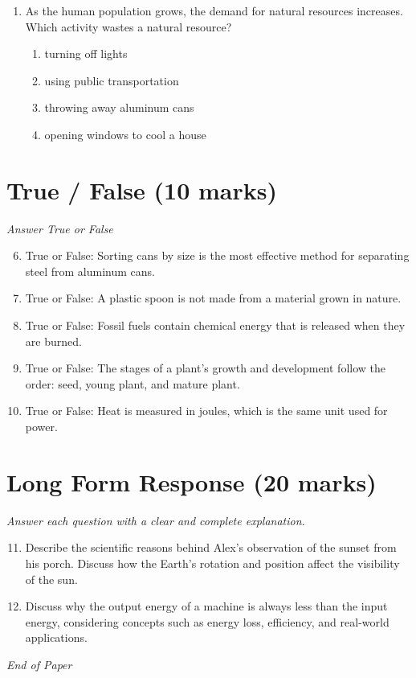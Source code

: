 \documentclass[12pt]{article}
\begin{document}
\begin{enumerate}[label=\arabic*.]
\begin{enumerate}[label=(\alph*)]
    \item The distance is a rough estimate.
    \item Only light can travel between stars.
    \item Light signals were timed reflecting from the star.
\end{enumerate}
\item As the human population grows, the demand for natural resources increases. Which activity wastes a natural resource?
\begin{enumerate}[label=(\alph*)]
    \item turning off lights
    \item using public transportation
    \item throwing away aluminum cans
    \item opening windows to cool a house
\end{enumerate}
\end{enumerate}

\section*{True / False (10 marks)}
\textit{Answer True or False}
\begin{enumerate}[label=\arabic*.]
\setcounter{enumi}{5}
\item True or False: Sorting cans by size is the most effective method for separating steel from aluminum cans.
\item True or False: A plastic spoon is not made from a material grown in nature.
\item True or False: Fossil fuels contain chemical energy that is released when they are burned.
\item True or False: The stages of a plant's growth and development follow the order: seed, young plant, and mature plant.
\item True or False: Heat is measured in joules, which is the same unit used for power.
\end{enumerate}

\section*{Long Form Response (20 marks)}
\textit{Answer each question with a clear and complete explanation.}
\begin{enumerate}[label=\arabic*.]
\setcounter{enumi}{10}
\item Describe the scientific reasons behind Alex's observation of the sunset from his porch. Discuss how the Earth's rotation and position affect the visibility of the sun.
\item Discuss why the output energy of a machine is always less than the input energy, considering concepts such as energy loss, efficiency, and real-world applications.
\end{enumerate}

\vfill
\noindent\textit{End of Paper}
\end{document}
